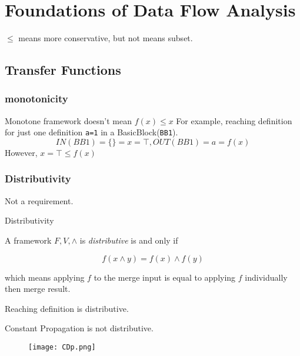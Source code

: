 
\section{Foundations of Data Flow Analysis}


$\leq$ means more conservative, but not means subset.


\subsection{Transfer Functions}





\subsubsection{monotonicity}


\begin{note}{Monotone framework doesn't mean $ f(x) \leq x$}
For example, reaching definition for just one definition \texttt{a=1} in a BasicBlock(\texttt{BB1}).  \[IN(BB1) = \{\} = x = \top , OUT(BB1) = {a} = f(x) \]
However, $x = \top \leq  f(x)$
\end{note}

\subsubsection{Distributivity}

Not a requirement.

\begin{definition}{Distributivity}

A framework $F,V, \wedge$ is \emph{distributive} is and only if 

\[f(x \wedge y)=f(x) \wedge f(y)\]

which means applying $f$ to the merge input is equal to applying $f$ individually then merge result. 
\end{definition}

Reaching definition is distributive.


Constant Propagation is not distributive. 
\begin{figure}[h]
    \centering
    \texttt{[image: CDp.png]}
    \caption{}
    \label{fig:p15}
\end{figure}

